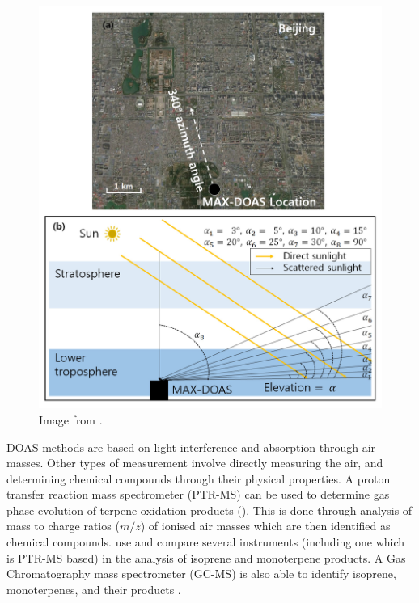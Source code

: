     \begin{figure}
      \includegraphics[width=\textwidth]{Figures/MAXDoasExample.png}
      \caption{ Image from \cite{Lee2015}.}
      \label{LR:HCHO:fig_MAXDOASExample}
    \end{figure}
        
    DOAS methods are based on light interference and absorption through air masses.
    Other types of measurement involve directly measuring the air, and determining chemical compounds through their physical properties.
    A proton transfer reaction mass spectrometer (PTR-MS) can be used to determine gas phase evolution of terpene oxidation products (\cite[eg.]{Lee2006a,Nguyen2014,Wolfe2016}).
    This is done through analysis of mass to charge ratios ($m/z$) of ionised air masses which are then identified as chemical compounds.
    \cite{Nguyen2014} use and compare several instruments (including one which is PTR-MS based) in the analysis of isoprene and monoterpene products.
    A Gas Chromatography mass spectrometer (GC-MS) is also able to identify isoprene, monoterpenes, and their products \cite[eg.]{Nguyen2014}.
    
